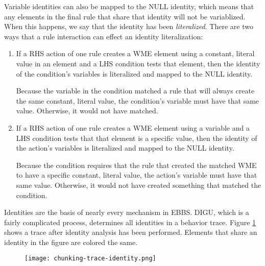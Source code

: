 
Variable identities can also be mapped to the NULL identity, which means that any elements in the final rule that share that identity will not be variablized. When this happens, we say that the identity has been \textit{literalized}.  There are two ways that a rule interaction can effect an identity literalization:

\begin{enumerate}
	\item If a RHS action of one rule creates a WME element using a constant, literal value in an element and a LHS condition tests that element, then the identity of the condition's variables is literalized and mapped to the NULL identity.

	Because the variable in the condition matched a rule that will always create the same constant, literal value, the condition's variable must have that same value.  Otherwise, it would not have matched.


	\item If a RHS action of one rule creates a WME element using a variable and a LHS condition tests that that element is a specific value, then the identity of the action's variables is literalized and mapped to the NULL identity.

	Because the condition requires that the rule that created the matched WME to have a specific constant, literal value, the action's variable must have that same value.  Otherwise, it would not have created something that matched the condition.
\end{enumerate}

Identities are the basis of nearly every mechanism in EBBS. DIGU, which is a fairly complicated process, determines all identities in a behavior trace.  Figure \ref{fig:chunking-trace-identity} shows a trace after identity analysis has been performed.  Elements that share an identity in the figure are colored the same.

\vspace{12pt}
\begin{figure}[!h]
	\centering
	\texttt{[image: chunking-trace-identity.png]}
	\label{fig:chunking-trace-identity}
\end{figure}

